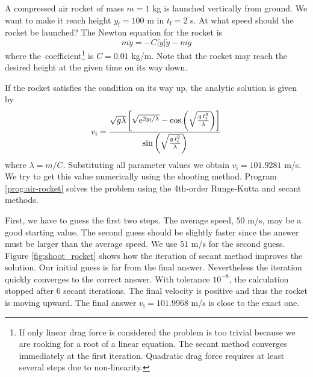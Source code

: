 \medskip
\noindent
\begin{example}\label{ex:shoot_rocket}

A compressed air rocket of mass $m=1$ kg is launched vertically from ground.  We want to make it reach height $y_\text{f}=100$ m in $t_\text{f}=2$ s.  At what speed should the rocket be launched?
The Newton equation for the rocket is
\begin{equation}\label{eq:eom_rocket}
m \ddot{y} = - C  |\dot{y}| \dot{y} - m g
\end{equation}
where the\ coefficient\footnote{If only linear drag force is considered the problem is too trivial because we are rooking for a root of a linear equation. The secant method converges immediately at the first iteration.  Quadratic drag force requires at least several steps due to non-linearity.} is $C=0.01$ kg/m. Note that the rocket may reach the desired height at the given time on its way down. 

If the rocket satisfies the condition on its way up, the analytic solution is given by
\begin{equation}
v_\text{i} = \frac{\sqrt{g \lambda} \left [\sqrt{\text{e}^{2 y_\text{f}/\lambda}}-\cos\left (\sqrt{\frac{g\, t_\text{f}^2}{\lambda}}\right )\right ]}{\sin\left (\sqrt{\frac{g\, t_\text{f}^2}{\lambda}}\right )}
\end{equation}
where $\lambda = m/C$.  Substituting all parameter values we obtain $v_\text{i}=101.9281$ m/s.  We try to get this value numerically using the shooting method.  Program \ref{prog:air-rocket} solves the problem using the 4th-order Runge-Kutta and secant methods.  

First, we have to guess the first two steps. The average speed, $50$ m/s, may be a good starting value.  The second guess should be slightly faster since the answer must be larger than the average speed. We use $51$ m/s for the second guess.  Figure \ref{fig:shoot_rocket} shows how the iteration of secant method improves the solution.  Our initial guess is far from the final answer.  Nevertheless the iteration quickly converges to the correct answer. With tolerance $10^{-8}$, the calculation stopped after 6 secant  iterations.  The final velocity is positive and thus the rocket is moving upward.  The final answer $v_\text{i}=101.9968$ m/s is close to the exact one. 


\end{example}
